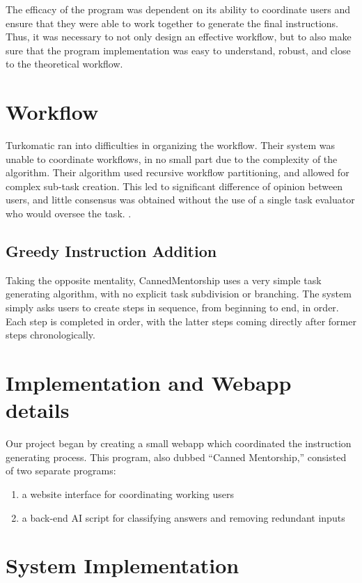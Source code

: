 The efficacy of the program was dependent on its ability to coordinate users and ensure that they were able to work together to generate the final instructions.
Thus, it was necessary to not only design an effective workflow, but to also make sure that the program implementation was easy to understand, robust, and close to the theoretical workflow.

\section{Workflow}
Turkomatic ran into difficulties in organizing the workflow. 
Their system was unable to coordinate workflows, in no small part due to the complexity of the algorithm.
Their algorithm used recursive workflow partitioning, and allowed for complex sub-task creation.
This led to significant difference of opinion between users, and little consensus was obtained without the use of a single task evaluator who would oversee the task.
.

\subsection{Greedy Instruction Addition}
Taking the opposite mentality, CannedMentorship uses a very simple task generating algorithm, with no explicit task subdivision or branching.
The system simply asks users to create steps in sequence, from beginning to end, in order.
Each step is completed in order, with the latter steps coming directly after former steps chronologically. 

\section{Implementation and Webapp details}
Our project began by creating a small webapp which coordinated the instruction generating process.
This program, also dubbed ``Canned Mentorship,'' consisted of two separate programs:

\begin{enumerate}
	\item a website interface for coordinating working users
	\item a back-end AI script for classifying answers and removing redundant inputs
\end{enumerate}

\section{System Implementation}

